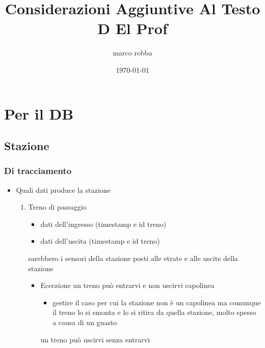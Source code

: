 \documentclass[11pt]{article}
\author{marco robba}
\date{\today}
\title{Considerazioni Aggiuntive Al Testo D El Prof}
\begin{document}
\maketitle
\tableofcontents

\section{Per il DB}
\label{sec:org51e787a}
\subsection{Stazione}
\label{sec:org6ea8298}
\subsubsection{Di tracciamento}
\label{sec:org6a68b48}
\begin{itemize}
\item Quali dati produce la stazione
\begin{enumerate}
\item Treno di passaggio
\begin{itemize}
\item dati dell'ingresso (timestamp e id treno)
\item dati dell'uscita  (timestamp e id treno)
\end{itemize}
sarebbero i sensori della stazione posti alle etrate e alle uscite della stazione
\begin{itemize}
\item Eccezione
un treno può entrarvi e non uscirvi capolinea
\begin{itemize}
\item gestire il caso per cui la stazione non è un capolinea ma comunque il treno lo si smonta e lo si ritira da quella stazione, molto spesso a causa di un guasto
\end{itemize}
un treno può uscirvi senza entrarvi
\end{itemize}
\end{enumerate}
\end{itemize}
\end{document}
